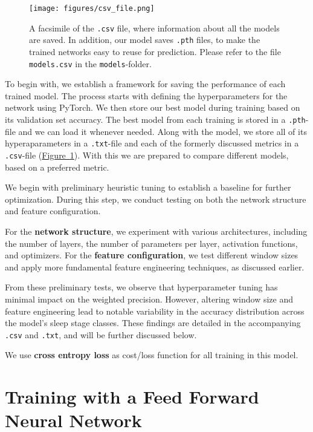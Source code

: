 \documentclass{article}
\begin{document}
\begin{figure}[H]
    \centering
    \texttt{[image: figures/csv\_file.png]} 
    \caption{A facsimile of the \texttt{.csv} file, where information about all the models are saved. In addition, our model saves \texttt{.pth} files, to make the trained networks easy to reuse for prediction. Please refer to the file \texttt{models.csv} in the \texttt{models}-folder.}
    \label{fig:csv_file}
\end{figure}

\begin{multicols}{2}
To begin with, we establish a framework for saving the performance of each trained model. The process starts with defining the hyperparameters for the network using PyTorch. We then store our best model during training based on its validation set accuracy. The best model from each training is stored in a \texttt{.pth}-file and we can load it whenever needed. Along with the model, we store all of its hyperaparameters in a \texttt{.txt}-file and each of the formerly discussed metrics in a \texttt{.csv}-file (\hyperref[fig:csv_file]{Figure~\ref*{fig:csv_file}}). With this we are prepared to compare different models, based on a preferred metric.

We begin with preliminary heuristic tuning to establish a baseline for further optimization. During this step, we conduct testing on both the network structure and feature configuration.

For the \textbf{network structure}, we experiment with various architectures, including the number of layers, the number of parameters per layer, activation functions, and optimizers. For the \textbf{feature configuration}, we test different window sizes and apply more fundamental feature engineering techniques, as discussed earlier.

From these preliminary tests, we observe that hyperparameter tuning has minimal impact on the weighted precision. However, altering window size and feature engineering lead to notable variability in the accuracy distribution across the model's sleep stage classes. These findings are detailed in the accompanying \texttt{.csv} and \texttt{.txt}, and will be further discussed below. 

We use \textbf{cross entropy loss} \cite{brovold_less_2024} \cite{hastie_elements_2009} as cost/loss function for all training in this model.

\end{multicols}
\section*{Training with a Feed Forward Neural Network}
\end{document}
